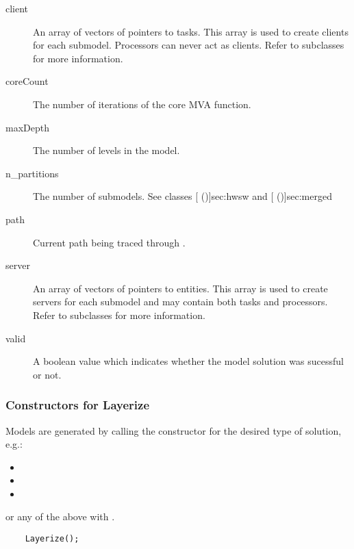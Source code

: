 \begin{description}
\item[client] \texonly{---} An array of vectors of pointers to
  tasks.  This array is used to create clients for each submodel.
  Processors can never act as clients.  Refer to subclasses for more
  information. 
\item[coreCount] \texonly{---} The number of iterations of the core
  MVA  function.
\item[maxDepth] \texonly{---} The number of levels in the model.
\item[n_partitions] \texonly{---} The number of submodels.  See
  classes [ (\Sec\Ref)]{sec:hwsw} and
  [ (\Sec\Ref)]{sec:merged}
\item[path] \texonly{---} Current path being traced through
  . \\
\item[server] \texonly{---} An array of vectors of pointers to
  entities.  This array is used to create servers for each submodel
  and may contain both tasks and processors.  Refer to subclasses for
  more information.
\item[valid] \texonly{---} A boolean value which indicates whether the
  model solution was sucessful or not.
\end{description}

\subsubsection{Constructors for Layerize}
\label{sec:layerize-constructors}

Models are generated by calling the constructor for the desired type
of solution, e.g.:
\begin{itemize}
\item {} 
\item {} 
\item {} 
\end{itemize}
or any of the above with .  

\begin{verbatim}
    Layerize();
\end{verbatim}

